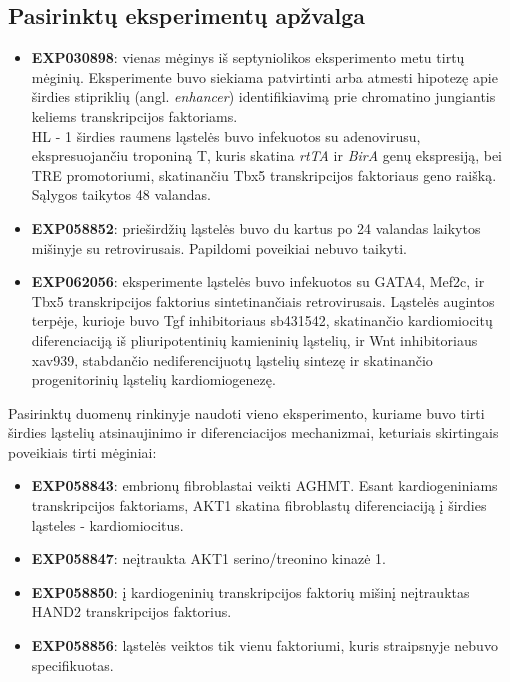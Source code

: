 \documentclass[12pt]{article}
\begin{document}
\subsection{Pasirinktų eksperimentų apžvalga}
\begin{itemize}
    \item \textbf{EXP030898}: vienas mėginys iš septyniolikos eksperimento
        metu tirtų mėginių. Eksperimente buvo siekiama patvirtinti arba
        atmesti hipotezę apie širdies stipriklių (angl. \emph{enhancer})
        identifikiavimą prie chromatino jungiantis keliems transkripcijos
        faktoriams. \\
        HL - 1 širdies raumens ląstelės buvo infekuotos su adenovirusu,
        ekspresuojančiu troponiną T, kuris skatina \emph{rtTA} ir \emph{BirA}
        genų ekspresiją, bei TRE promotoriumi, skatinančiu Tbx5 transkripcijos
        faktoriaus geno raišką. Sąlygos taikytos 48 valandas.
    \item \textbf{EXP058852}: prieširdžių ląstelės buvo du kartus po 24
        valandas laikytos mišinyje su retrovirusais. Papildomi poveikiai nebuvo
        taikyti.
    \item \textbf{EXP062056}: eksperimente ląstelės buvo infekuotos su GATA4,
        Mef2c, ir Tbx5 transkripcijos faktorius sintetinančiais retrovirusais.
        Ląstelės augintos terpėje, kurioje buvo {Tgf\textbeta} inhibitoriaus
        sb431542, skatinančio kardiomiocitų diferenciaciją iš pliuripotentinių
        kamieninių ląstelių, ir Wnt inhibitoriaus xav939, stabdančio
        nediferencijuotų ląstelių sintezę ir skatinančio progenitorinių
        ląstelių kardiomiogenezę.
\end{itemize}

Pasirinktų duomenų rinkinyje naudoti vieno eksperimento, kuriame buvo tirti
širdies ląstelių atsinaujinimo ir diferenciacijos mechanizmai, keturiais
skirtingais poveikiais tirti mėginiai:

\begin{itemize}
    \item \textbf{EXP058843}: embrionų fibroblastai veikti AGHMT. Esant
        kardiogeniniams transkripcijos faktoriams, AKT1 skatina fibroblastų
        diferenciaciją į širdies ląsteles - kardiomiocitus.
    \item \textbf{EXP058847}: neįtraukta AKT1 serino/treonino kinazė 1.
    \item \textbf{EXP058850}: į kardiogeninių transkripcijos faktorių mišinį
        neįtrauktas HAND2 transkripcijos faktorius.
    \item \textbf{EXP058856}: ląstelės veiktos tik vienu faktoriumi, kuris
        straipsnyje nebuvo specifikuotas.
  \end{itemize}
\newpage
\end{document}
